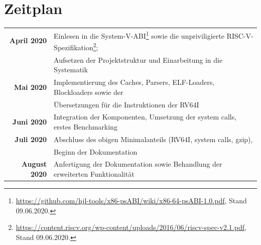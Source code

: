 \documentclass{article}
\begin{document}
\section*{Zeitplan}
\begin{center}
	\begin{tabular}{|r|l|}
		\hline
		\textbf{April 2020} & Einlesen in die System-V-ABI\footnote{\url{https://github.com/hjl-tools/x86-psABI/wiki/x86-64-psABI-1.0.pdf}, Stand 09.06.2020.} sowie die unpriviligierte RISC-V-Spezifikation\footnote{\url{https://content.riscv.org/wp-content/uploads/2016/06/riscv-spec-v2.1.pdf}, Stand 09.06.2020.};\\
		& Aufsetzen der Projektstruktur und Einarbeitung in die Systematik\\
		\hline
		\textbf{Mai 2020} & Implementierung des Caches, Parsers, ELF-Loaders, Blockloaders sowie der\\
		& Übersetzungen für die Instruktionen der RV64I\\
		\hline
		\textbf{Juni 2020} & Integration der Komponenten, Umsetzung der system calls, erstes Benchmarking\\
		\hline
		\textbf{Juli 2020} & Abschluss des obigen Minimalanteils (RV64I, system calls, gzip),\\
		&Beginn der Dokumentation\\
		\hline
		\textbf{August 2020} & Anfertigung der Dokumentation sowie Behandlung der erweiterten Funktionalität\\
		\hline
	\end{tabular}
\end{center}
\end{document}
